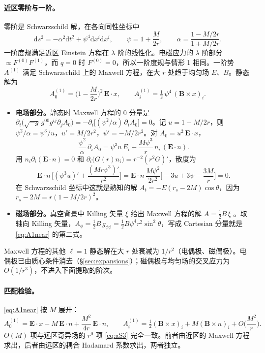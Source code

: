 \documentclass[11pt,a4paper]{ctexart}
\numberwithin{equation}{section}
\newcommand{\dd}{\mathrm d}
\begin{document}
\paragraph{近区零阶与一阶。}零阶是 Schwarzschild 解，在各向同性坐标中
\begin{equation}
\dd s^2=-\alpha^2\dd t^2+\psi^4\dd x^i\dd x^i,\qquad \psi=1+\frac M{2r},\qquad \alpha=\frac{1-M/2r}{1+M/2r}.
\end{equation}
一阶度规满足近区 Einstein 方程在 $\lambda$ 阶的线性化。电磁应力的 $\lambda$ 阶部分 $\propto F^{(0)}F^{(1)}$，而 $q=0$ 时 $F^{(0)}=0$，所以一阶度规与情形 1 相同。一阶势 $A^{(1)}$ 满足 Schwarzschild 上的 Maxwell 方程，在大 $r$ 处趋于均匀场 $E$、$B$。静态解为
\begin{equation}
A^{(1)}_0=\Big(1-\frac M{2r}\Big)^2\,\boldsymbol E\!\cdot\!x,\qquad
A^{(1)}_i=\tfrac12\,\psi^4\,(\boldsymbol B\times x)_i .
\label{eq:A1near}
\end{equation}
\begin{itemize}
\item \textbf{电场部分。}静态时 Maxwell 方程的 $0$ 分量是 $\partial_i\big(\sqrt{-g}\,g^{00}g^{ij}\partial_jA_0\big)=-\partial_i\big[(\psi^2/\alpha)\,\partial_iA_0\big]=0$。记 $u=1-M/2r$，则 $\psi^2/\alpha=\psi^3/u$，$u'=M/2r^2$，$\psi'=-M/2r^2$。对 $A_0=u^2\,\boldsymbol E\!\cdot\!x$，
\begin{equation*}
\frac{\psi^2}\alpha\,\partial_iA_0=\psi^3u\,E_i+\frac{M\psi^3}{r}\,n_i\,(\boldsymbol E\!\cdot\!n).
\end{equation*}
用 $n_i\partial_i(\boldsymbol E\!\cdot\!n)=0$ 和 $\partial_i\big(G(r)n_i\big)=r^{-2}(r^2G)'$，散度为
\begin{equation*}
\boldsymbol E\!\cdot\!n\,\Big[(\psi^3u)'+\frac{(Mr\psi^3)'}{r^2}\Big]
=\boldsymbol E\!\cdot\!n\,\frac{M\psi^2}{2r^2}\Big[-3u+3\psi-\frac{3M}{r}\Big]=0 .
\end{equation*}
在 Schwarzschild 坐标中这就是熟知的解 $A_t=-E(r_s-2M)\cos\theta$，因为 $r_s-2M=r(1-M/2r)^2$。
\item \textbf{磁场部分。}真空背景中 Killing 矢量 $\xi$ 给出 Maxwell 方程的解 $A=\tfrac12B\,\xi$ \citep{Wald1974}。取轴向 Killing 矢量，$A_\phi=\tfrac12B\,g_{\phi\phi}=\tfrac12B\psi^4r^2\sin^2\theta$，写成 Cartesian 分量就是 \eqref{eq:A1near} 的第二式。
\end{itemize}
Maxwell 方程的其他 $\ell=1$ 静态解在大 $r$ 处衰减为 $1/r^2$（电偶极、磁偶极）。电偶极已由质心条件消去（\S\ref{sec:expansions}）；磁偶极与均匀场的交叉应力为 $O(1/r^3)$，不进入下面提取的阶次。

\paragraph{匹配检验。}\eqref{eq:A1near} 按 $M$ 展开：
\begin{equation*}
A^{(1)}_0=\boldsymbol E\!\cdot\!x-M\,\boldsymbol E\!\cdot\!n+\frac{M^2}{4r}\,\boldsymbol E\!\cdot\!n,\qquad
A^{(1)}_i=\tfrac12(\boldsymbol B\times x)_i+M(\boldsymbol B\times n)_i+O\Big(\frac{M^2}r\Big).
\end{equation*}
$O(M)$ 项与远区奇异场的 $r^0$ 项 \eqref{eq:aS3} 完全一致。前者由近区的 Maxwell 方程求出，后者由远区的耦合 Hadamard 系数求出，两者独立。
\end{document}
